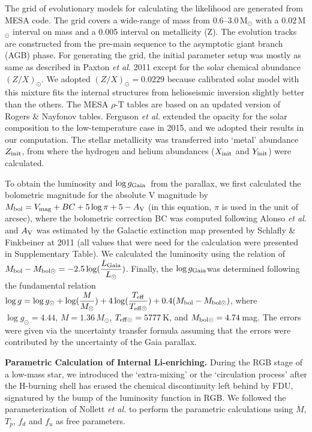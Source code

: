 \documentclass[twoside,onecolumnm,12pt]{article}
\newcommand{\upcite}[1]{\textsuperscript{\textsuperscript{\cite{#1}}}}
\newcommand{\logggaia}{$\log g_{\rm Gaia}$}
\begin{document}
The grid of evolutionary models for calculating the likelihood are generated from MESA\upcite{Paxton2011} code. The grid covers a wide-range of mass from $0.6$--$3.0$\,M$_{\odot}$ with a $0.02$\,M$_{\odot}$ interval on mass and a 0.005 interval on metallicity (Z). The evolution tracks are constructed from the pre-main sequence to the asymptotic giant branch (AGB) phase. For generating the grid, the initial parameter setup was mostly as same as described in Paxton \emph{et al.} 2011\upcite{Paxton2011} except for the solar chemical abundance $(Z/X)_{\odot}$. We adopted $(Z/X)_{\odot}=0.0229$\upcite{Grevesse1998} because calibrated solar model with this mixture fits the internal structures from helioseismic inversion\upcite{Bi2011} slightly better than the others\upcite{Asplund2009}. The MESA $\rho$-T tables are based on an updated version of Rogers \& Nayfonov tables\upcite{Rogers2002}. Ferguson \emph{et al.}\upcite{Ferguson2005} extended the opacity for the solar composition to the low-temperature case in 2015, and we adopted their results in our computation. The stellar metallicity was transferred into `metal' abundance $Z_{\rm{init}}$, from where the hydrogen and helium abundances ($X_{\rm{init}}$ and $Y_{\rm{init}}$) were calculated.

To obtain the luminosity and \logggaia\ from the parallax, we first calculated the bolometric magnitude for the absolute V magnitude by $M_{\rm bol}=V_{\rm mag}+BC+5\log\pi+5-A_{\rm V}$ (in this equation, $\pi$ is used in the unit of arcsec), where the bolometric correction BC was computed following Alonso \emph{et al.}\upcite{Alonso1999} and $A_{\rm V}$ was estimated by the Galactic extinction map presented by Schlafly \& Finkbeiner at 2011\upcite{Schlafly2011} (all values that were need for the calculation were presented in Supplementary Table). We calculated the luminosity using the relation of $\displaystyle M_{\rm bol}-M_{\rm bol\odot}=-2.5\log(\frac{L_{\rm{Gaia}}}{L_{\odot}})$. Finally, the \logggaia was determined following the fundamental relation $\displaystyle \log g = \log g_{\odot}+\log (\frac{M}{M_{\odot}})+4\log(\frac{T_{\rm eff}}{T_{\rm eff\odot}})+0.4(M_{\rm bol}-M_{\rm bol\odot})$, where $\log g_{\odot}=4.44$, $M=1.36\,M_{\odot}$, $T_{\rm eff\odot}=5777$\,K, and $M_{\rm bol\odot} = 4.74$\,mag. The errors were given via the uncertainty transfer formula assuming that the errors were contributed by the uncertainty of the Gaia parallax.



\vspace{10pt}
\noindent\textbf{Parametric Calculation of Internal Li-enriching.} During the RGB stage of a low-mass star, we introduced the `extra-mixing' or the `circulation process' after the H-burning shell has erased the chemical discontinuity left behind by FDU, signatured by the bump of the luminosity function in RGB. We followed the parameterization of Nollett \emph{et al.}\upcite{Nollett2003} to perform the parametric calculations using $\dot{M}$, $T_p$, $f_d$ and $f_u$ as free parameters.
\end{document}
